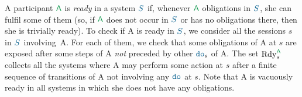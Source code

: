 A participant $\pmv A$ is \emph{ready} in a system $\sysS$ %
if, whenever $\pmv A$ obligations in $\sysS$, she can fulfil some of them  %
(so, if $\pmv A$ does not occur in $\sysS$ or has no obligations there,
then she is trivially ready). %
To check if {\pmv A} is ready in $\sysS$, 
we consider all the sessions $s$ in $\sysS$ involving~{\pmv A}. %
For each of them, we check that some obligations of {\pmv A} at $s$
are exposed after some steps of {\pmv A}
\emph{not} preceded by other $\fact{s}{\!}$ of {\pmv A}.
The set $\RdyS{\pmv A}{s}$ collects all the systems 
where {\pmv A} may perform some action at $s$ after a finite sequence 
of transitions of {\pmv A} not involving any $\fact{}{}\!$ at $s$.
Note that {\pmv A} is vacuously ready in all systems in which she does
not have any obligations.




